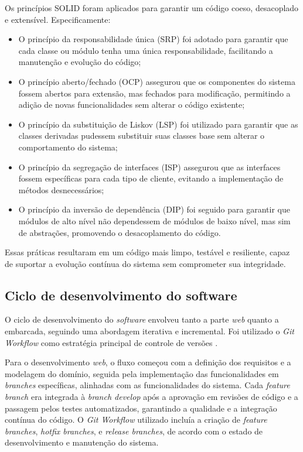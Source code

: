 Os princípios SOLID foram aplicados para garantir um código coeso, desacoplado e extensível. Especificamente:
\begin{itemize}
    \item O princípio da responsabilidade única (SRP) foi adotado para garantir que cada classe ou módulo tenha uma única responsabilidade, facilitando a manutenção e evolução do código;
    \item O princípio aberto/fechado (OCP) assegurou que os componentes do sistema fossem abertos para extensão, mas fechados para modificação, permitindo a adição de novas funcionalidades sem alterar o código existente;
    \item O princípio da substituição de Liskov (LSP) foi utilizado para garantir que as classes derivadas pudessem substituir suas classes base sem alterar o comportamento do sistema;
    \item O princípio da segregação de interfaces (ISP) assegurou que as interfaces fossem específicas para cada tipo de cliente, evitando a implementação de métodos desnecessários;
    \item O princípio da inversão de dependência (DIP) foi seguido para garantir que módulos de alto nível não dependessem de módulos de baixo nível, mas sim de abstrações, promovendo o desacoplamento do código.
\end{itemize}

Essas práticas resultaram em um código mais limpo, testável e resiliente, capaz de suportar a evolução contínua do sistema sem comprometer sua integridade.

\subsection{Ciclo de desenvolvimento do software}

O ciclo de desenvolvimento do \textit{software} envolveu tanto a parte \textit{web} quanto a embarcada, seguindo uma abordagem iterativa e incremental. Foi utilizado o \textit{Git Workflow} como estratégia principal de controle de versões \parencite{pro_git}.

Para o desenvolvimento \textit{web}, o fluxo começou com a definição dos requisitos e a modelagem do domínio, seguida pela implementação das funcionalidades em \textit{branches} específicas, alinhadas com as funcionalidades do sistema. Cada \textit{feature branch} era integrada à \textit{branch develop} após a aprovação em revisões de código e a passagem pelos testes automatizados, garantindo a qualidade e a integração contínua do código. O \textit{Git Workflow} utilizado incluía a criação de \textit{feature branches}, \textit{hotfix branches}, e \textit{release branches}, de acordo com o estado de desenvolvimento e manutenção do sistema.

